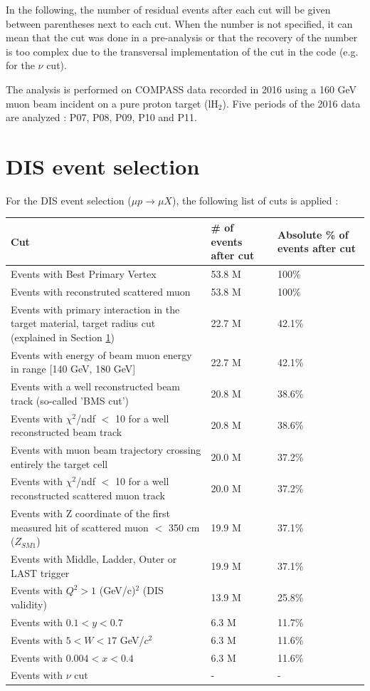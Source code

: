 In the following, the number of residual events after each cut will be given between parentheses next to each cut.
When the number is not specified, it can mean that the cut was done in a pre-analysis or that the recovery of the number is too complex due to the transversal implementation of the cut in the code (e.g. for the $\nu$ cut).

The analysis is performed on COMPASS data recorded in 2016 using a 160 GeV muon beam incident on a pure proton target (lH$_2$).
Five periods of the 2016 data are analyzed : P07, P08, P09, P10 and P11.


\section{DIS event selection}

For the DIS event selection ($\mu p \rightarrow \mu X$), the following list of cuts is applied :

\begin{table}[!h]
  \centering
  \begin{tabular}{p{10cm} p{2cm} p{2cm}}
    \hline
    \hline
     Cut & \# of events after cut & Absolute \% of events after cut  \\
    \hline
    \hline
    Events with Best Primary Vertex & 53.8 M & 100\% \\
    Events with reconstruted scattered muon & 53.8 M & 100\% \\
    Events with primary interaction in the target material, target radius cut (explained in Section \ref{}) & 22.7 M & 42.1\% \\
    Events with energy of beam muon energy in range [140 GeV, 180 GeV] & 22.7 M & 42.1\% \\
    Events with a well reconstructed beam track (so-called 'BMS cut') & 20.8 M & 38.6\% \\
    Events with $\chi^2$/ndf $<$ 10 for a well reconstructed beam track & 20.8 M & 38.6\% \\
    Events with muon beam trajectory crossing entirely the target cell & 20.0 M & 37.2\% \\
    Events with $\chi^2$/ndf $<$ 10 for a well reconstructed scattered muon track & 20.0 M & 37.2\% \\
    Events with Z coordinate of the first measured hit of scattered muon $<$ 350 cm ($Z_{SM1}$) & 19.9 M & 37.1\% \\
    Events with Middle, Ladder, Outer or LAST trigger & 19.9 M & 37.1\% \\
    Events with $Q^2>1$ (GeV/c)$^2$ (DIS validity) & 13.9 M & 25.8\% \\
    Events with $0.1 < y < 0.7$ & 6.3 M & 11.7\% \\
    Events with $5 < W < 17$ GeV/$c^2$ & 6.3 M & 11.6\% \\
    Events with $0.004 < x < 0.4$ & 6.3 M & 11.6\% \\
    Events with $\nu$ cut & - & - \\
    \hline
    \hline
  \end{tabular}
\end{table}

